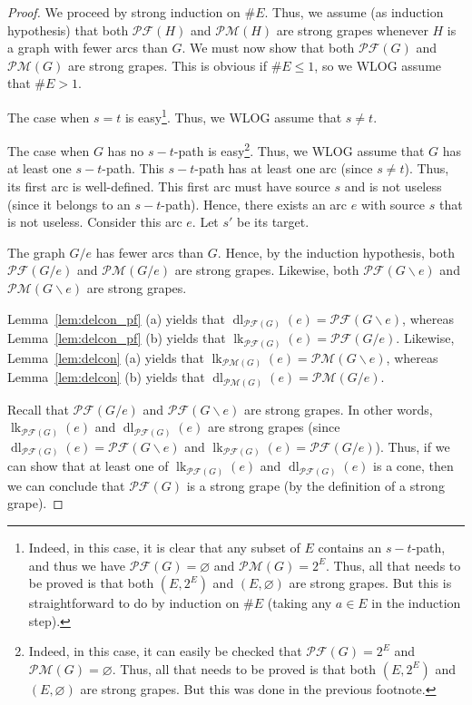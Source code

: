 \documentclass[12pt]{amsart}
\theoremstyle{definition}
\DeclareMathOperator{\lk}{lk}
\DeclareMathOperator{\dl}{dl}
\newcommand{\tup}[1]{\left( #1 \right)}
\newcommand{\Pm}[1]{\mathcal{PM}\left(#1\right)}
\newcommand{\Pf}[1]{\mathcal{PF}\left(#1\right)}
\begin{document}
\begin{proof}
We proceed by strong induction on $\# E$.
Thus, we assume (as induction hypothesis) that both $\Pf{H}$ and $\Pm{H}$ are strong grapes whenever $H$ is a graph with fewer arcs than $G$.
We must now show that both $\Pf{G}$ and $\Pm{G}$ are strong grapes.
This is obvious if $\# E \leq 1$, so we WLOG assume that $\# E > 1$.

The case when $s = t$ is easy\footnote{%
Indeed, in this case, it is clear that any subset of $E$
contains an $s-t$-path, and thus we have
$\Pf{G} = \varnothing$ and $\Pm{G} = 2^E$.
Thus, all that needs to be proved is that both $\tup{E, 2^E}$
and $\tup{E, \varnothing}$ are strong grapes.
But this is straightforward to do by induction on $\# E$
(taking any $a \in E$ in the induction step).}.
Thus, we WLOG assume that $s \neq t$.

The case when $G$ has no $s-t$-path is easy\footnote{%
Indeed, in this case, it can easily be checked that
$\Pf{G} = 2^E$ and $\Pm{G} = \varnothing$.
Thus, all that needs to be proved is that both $\tup{E, 2^E}$
and $\tup{E, \varnothing}$ are strong grapes.
But this was done in the previous footnote.}.
Thus, we WLOG assume that $G$ has at least one $s-t$-path.
This $s-t$-path has at least one arc (since $s \neq t$).
Thus, its first arc is well-defined.
This first arc must have source $s$ and is not useless (since it
belongs to an $s-t$-path).
Hence, there exists an arc $e$ with source $s$ that is not useless.
Consider this arc $e$.
Let $s'$ be its target.

The graph $G / e$ has fewer arcs than $G$.
Hence, by the induction hypothesis, both
$\Pf{G / e}$ and $\Pm{G / e}$ are strong grapes.
Likewise, both
$\Pf{G \backslash e}$ and $\Pm{G \backslash e}$ are strong grapes.

Lemma~\ref{lem:delcon_pf} (a) yields
that $\dl_{\Pf{G}}(e) = \Pf{G \backslash e}$,
whereas
Lemma~\ref{lem:delcon_pf} (b) yields
that $\lk_{\Pf{G}}(e) = \Pf{G / e}$.
Likewise, Lemma~\ref{lem:delcon} (a) yields
that $\lk_{\Pm{G}}(e) = \Pm{G \backslash e}$,
whereas
Lemma~\ref{lem:delcon} (b) yields
that $\dl_{\Pm{G}}(e) = \Pm{G / e}$.

Recall that $\Pf{G / e}$ and $\Pf{G \backslash e}$ are
strong grapes.
In other words, $\lk_{\Pf{G}}(e)$ and $\dl_{\Pf{G}}(e)$
are strong grapes
(since $\dl_{\Pf{G}}(e) = \Pf{G \backslash e}$ and
$\lk_{\Pf{G}}(e) = \Pf{G / e}$).
Thus, if we can show that at least one of
$\lk_{\Pf{G}}(e)$ and $\dl_{\Pf{G}}(e)$ is a cone,
then we can conclude that $\Pf{G}$ is a strong grape
(by the definition of a strong grape).


\end{proof}
\end{document}
